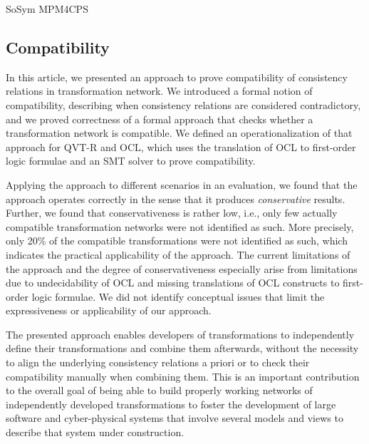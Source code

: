 \begin{copiedFrom}{SoSym MPM4CPS}

\subsection*{Compatibility}

In this article, we presented an approach to prove compatibility of consistency relations in transformation network.
We introduced a formal notion of compatibility, describing when consistency relations are considered contradictory, and we proved correctness of a formal approach that checks whether a transformation network is compatible.
We defined an operationalization of that approach for QVT-R and OCL, which uses the translation of OCL to first-order logic formulae and an SMT solver to prove compatibility.

Applying the approach to different scenarios in an evaluation, we found that the approach operates correctly in the sense that it produces \emph{conservative} results.
Further, we found that conservativeness is rather low, i.e., only few actually compatible transformation networks were not identified as such.
More precisely, only 20\% of the compatible transformations were not identified as such, which indicates the practical applicability of the approach.
The current limitations of the approach and the degree of conservativeness especially arise from limitations due to undecidability of OCL and missing translations of OCL constructs to first-order logic formulae.
We did not identify conceptual issues that limit the expressiveness or applicability of our approach.

The presented approach enables developers of transformations to independently define their transformations and combine them afterwards, without the necessity to align the underlying consistency relations a priori or to check their compatibility manually when combining them.
This is an important contribution to the overall goal of being able to build properly working networks of independently developed transformations to foster the development of large software and cyber-physical systems that involve several models and views to describe that system under construction.


\end{copiedFrom} %



